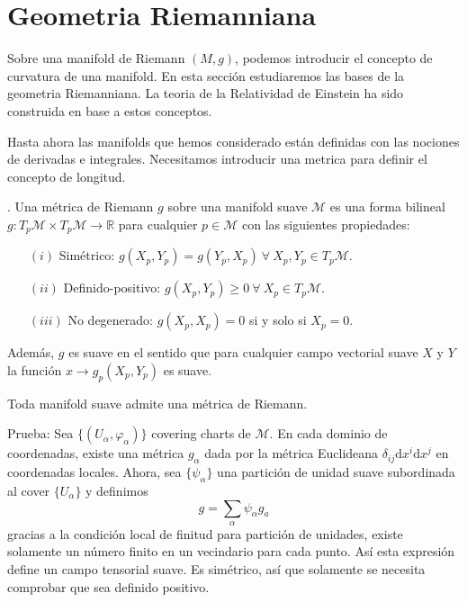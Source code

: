 \documentclass[../main]{subfiles}
\begin{document}
\section{Geometria Riemanniana}
Sobre una manifold de Riemann $(M,g)$, podemos introducir el concepto de curvatura de una manifold. En esta sección estudiaremos las bases de la geometria Riemanniana. La teoria de la Relatividad de Einstein ha sido construida en base a estos conceptos.

Hasta ahora las manifolds que hemos considerado están definidas con las nociones de derivadas e integrales. Necesitamos introducir una metrica para definir el concepto de longitud.

. Una métrica de Riemann $g$ sobre una manifold suave $\mathcal{M}$ es una forma bilineal $g: T_p \mathcal{M}\times T_p \mathcal{M} \rightarrow \mathbb{R}$ para cualquier $p\in \mathcal{M}$ con las siguientes propiedades:
\begin{enumerate}
    \item[$(i)$] Simétrico: $g(X_p, Y_p)=g(Y_p, X_p) \ \forall \ X_p, Y_p \in T_p\mathcal{M}$.
    \item[$(ii)$] Definido-positivo: $g(X_p, Y_p)\geq 0 \ \forall \ X_p \in T_p \mathcal{M}$. 
    \item[$(iii)$] No degenerado: $g(X_p, X_p)=0$ si y solo si $X_p=0$.  
\end{enumerate}

Además, $g$ es suave en el sentido que para cualquier campo vectorial suave $X$ y $Y$ la función $x\rightarrow g_p(X_p, Y_p)$ es suave.

 Toda manifold suave admite una métrica de Riemann.

Prueba: Sea $\{(U_{\alpha}, \varphi_{\alpha})\}$ covering charts de $\mathcal{M}$. En cada dominio de coordenadas, existe una métrica $g_{\alpha}$ dada por la métrica Euclideana $\delta_{ij}\mathrm{d}x^{i}\mathrm{d}x^{j}$ en coordenadas locales. Ahora, sea $\{\psi_{\alpha}\}$ una partición de unidad suave subordinada al cover $\{U_{\alpha}\}$ y definimos
\begin{equation}
    g=\sum_{\alpha}\psi_{\alpha}g_{a}
\end{equation}
gracias a la condición local de finitud para partición de unidades, existe solamente un número finito en un vecindario para cada punto. Así esta expresión define un campo tensorial suave. Es simétrico, así que solamente se necesita comprobar que sea definido positivo. 
\end{document}
